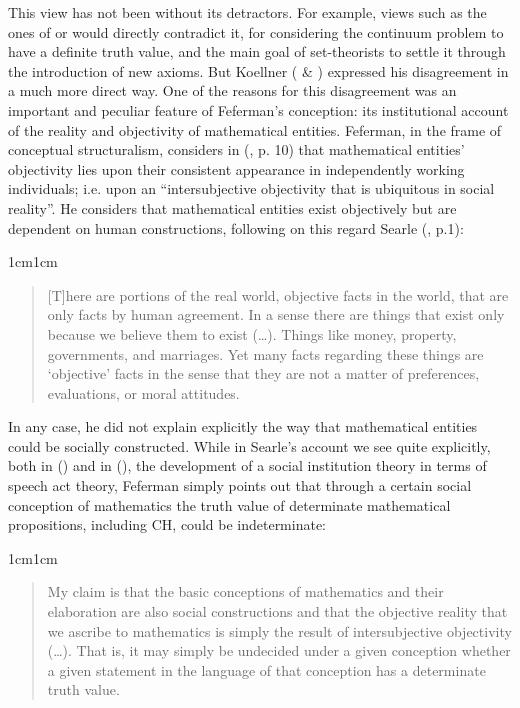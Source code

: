 \documentclass[11pt,a4paper]{article}
\begin{document}
This view has not been without its detractors. For example, views such as the ones of \textcite{Woodin2001a} or \textcite{Maddy1997} would directly contradict it, for considering the continuum problem to have a definite truth value, and the main goal of set-theorists to settle it through the introduction of new axioms. But Koellner (\citeyear{Koellner2016} \& \citeyear{Koellner2022}) expressed his disagreement in a much more direct way. One of the reasons for this disagreement was an important and peculiar feature of Feferman's conception: its institutional account of the reality and objectivity of mathematical entities. Feferman, in the frame of conceptual structuralism, considers in (\citeyear{Feferman2011a}, p. 10) that mathematical entities' objectivity lies upon their consistent appearance in independently working individuals; i.e. upon an “intersubjective objectivity that is ubiquitous in social reality”. He considers that mathematical entities exist objectively but are dependent on human constructions, following on this regard Searle (\citeyear{searle1995}, p.1): 

\begin{adjustwidth}{1cm}{1cm}
\small
\begin{quote}
[T]here are portions of the real world, objective facts in the world, that are only facts by human agreement. In a sense there are things that exist only because we believe them to exist (…). Things like money, property, governments, and marriages. Yet many facts regarding these things are ‘objective' facts in the sense that they are not a matter of preferences, evaluations, or moral attitudes. 
\end{quote}
\end{adjustwidth}

In any case, he did not explain explicitly the way that mathematical entities could be socially constructed. While in Searle's account we see quite explicitly, both in (\citeyear{searle1995}) and in (\citeyear{searle2010}), the development of a social institution theory in terms of speech act theory, Feferman simply points out that through a certain social conception of mathematics the truth value of determinate mathematical propositions, including CH, could be indeterminate: 

\begin{adjustwidth}{1cm}{1cm}
\small
\begin{quote}
My claim is that the basic conceptions of mathematics and their elaboration are also social constructions and that the objective reality that we ascribe to mathematics is simply the result of intersubjective objectivity (…). That is, it may simply be undecided under a given conception whether a given statement in the language of that conception has a determinate truth value. 
\end{quote}
\hfill \textcite[p. 13]{Feferman2011a}
\end{adjustwidth}
\end{document}
